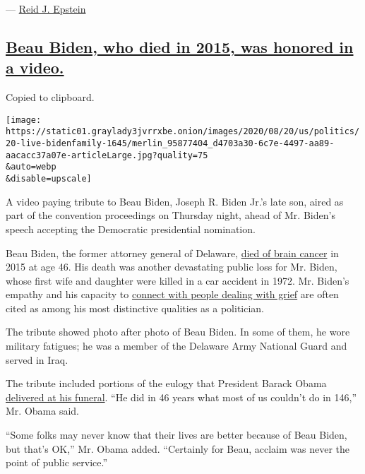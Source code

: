 --- \href{https://www.nytimes3xbfgragh.onion/by/reid-j-epstein}{Reid J.
Epstein}

\hypertarget{beau-biden-who-died-in-2015-was-honored-in-a-video}{%
\subsection{\texorpdfstring{\protect\hyperlink{beau-biden-who-died-in-2015-was-honored-in-a-video}{Beau
Biden, who died in 2015, was honored in a
video.}}{Beau Biden, who died in 2015, was honored in a video.}}\label{beau-biden-who-died-in-2015-was-honored-in-a-video}}

Copied to clipboard.

\texttt{[image: https://static01.graylady3jvrrxbe.onion/images/2020/08/20/us/politics/20-live-bidenfamily-1645/merlin\_95877404\_d4703a30-6c7e-4497-aa89-aacacc37a07e-articleLarge.jpg?quality=75\\\&auto=webp\\\&disable=upscale]}

A video paying tribute to Beau Biden, Joseph R. Biden Jr.'s late son,
aired as part of the convention proceedings on Thursday night, ahead of
Mr. Biden's speech accepting the Democratic presidential nomination.

Beau Biden, the former attorney general of Delaware,
\href{https://www.nytimes3xbfgragh.onion/2015/05/31/us/politics/joseph-r-biden-iii-vice-presidents-son-beau-dies-at-46.html}{died
of brain cancer} in 2015 at age 46. His death was another devastating
public loss for Mr. Biden, whose first wife and daughter were killed in
a car accident in 1972. Mr. Biden's empathy and his capacity to
\href{https://www.nytimes3xbfgragh.onion/2019/05/30/us/politics/joe-biden-beau-biden-death.html}{connect
with people dealing with grief} are often cited as among his most
distinctive qualities as a politician.

The tribute showed photo after photo of Beau Biden. In some of them, he
wore military fatigues; he was a member of the Delaware Army National
Guard and served in Iraq.

The tribute included portions of the eulogy that President Barack Obama
\href{https://www.nytimes3xbfgragh.onion/2015/06/07/us/beau-biden-funeral-held-in-delaware.html}{delivered
at his funeral}. ``He did in 46 years what most of us couldn't do in
146,'' Mr. Obama said.

``Some folks may never know that their lives are better because of Beau
Biden, but that's OK,'' Mr. Obama added. ``Certainly for Beau, acclaim
was never the point of public service.''

